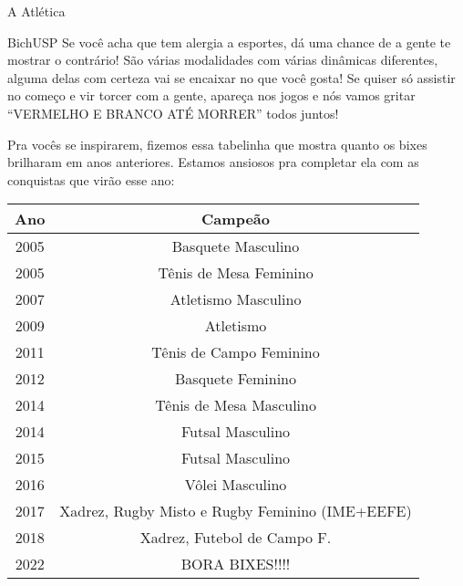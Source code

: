 \begin{secao}{A Atlética}
\begin{subsecao}{BichUSP}
Se você acha que tem alergia a esportes, dá uma chance de a gente te mostrar
o contrário! São várias modalidades com várias dinâmicas diferentes, alguma
delas com certeza vai se encaixar no que você gosta! Se quiser só assistir
no começo e vir torcer com a gente, apareça nos jogos e nós vamos gritar
``VERMELHO E BRANCO ATÉ MORRER'' todos juntos!



Pra vocês se inspirarem, fizemos essa tabelinha que mostra quanto os bixes
brilharam em anos anteriores. Estamos ansiosos pra completar ela com as
conquistas que virão esse ano:

\begin{center}
  \begin{tabular}{c|c}
    \hline
    Ano & Campeão\\
    \hline
    2005 & Basquete Masculino \\
    2005 & Tênis de Mesa Feminino \\
    2007 & Atletismo Masculino\\
    2009 & Atletismo\\
    2011 & Tênis de Campo Feminino\\
    2012 & Basquete Feminino\\
    2014 & Tênis de Mesa Masculino\\
    2014 & Futsal Masculino\\
    2015 & Futsal Masculino\\
    2016 & Vôlei Masculino\\
    2017 & Xadrez, Rugby Misto e Rugby Feminino (IME+EEFE)\\
    2018 & Xadrez, Futebol de Campo F.\\
    2022 & BORA BIXES!!!!\\
    \hline
  \end{tabular}
\end{center}


\end{subsecao}
\end{secao}
